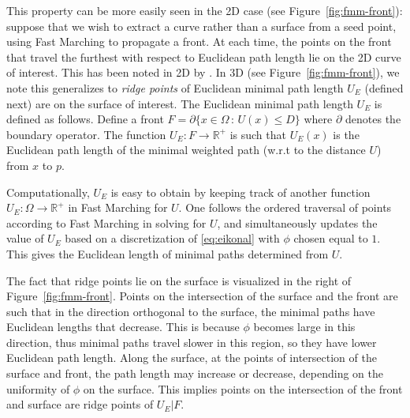 \documentclass[10pt,journal,compsoc]{IEEEtran}
\newcommand{\R}{\mathbb{R}}
\begin{document}
This property can be more easily seen in the 2D case (see
Figure~\ref{fig:fmm-front}): suppose that we wish to extract a curve
rather than a surface from a seed point, using Fast Marching to
propagate a front. At each time, the points on the front that travel
the furthest with respect to Euclidean path length lie on the 2D curve
of interest. This has been noted in 2D by \cite{kaul2012detecting}. In
3D (see Figure~\ref{fig:fmm-front}), we note this generalizes to
\emph{ridge points} of Euclidean minimal path length $U_E$ (defined
next) are on the surface of interest. The Euclidean minimal path
length $U_E$ is defined as follows. Define a front
$F = \partial \{ x\in \Omega \,:\, U(x) \leq D \}$ where $\partial$
denotes the boundary operator. The function $U_E : F\to \R^+$ is such
that $U_E(x) $ is the Euclidean path length of the minimal weighted
path (w.r.t to the distance $U$) from $x$ to $p$.

Computationally, $U_E$ is easy to obtain by keeping track of another
function $U_E : \Omega \to\R^+$ in Fast Marching for $U$. One follows
the ordered traversal of points according to Fast Marching in solving
for $U$, and simultaneously updates the value of $U_E$ based on a
discretization of \eqref{eq:eikonal} with $\phi$ chosen equal to
$1$. This gives the Euclidean length of minimal paths determined from
$U$.

The fact that ridge points lie on the surface is visualized in the
right of Figure~\ref{fig:fmm-front}. Points on the intersection of the
surface and the front are such that in the direction orthogonal to the
surface, the minimal paths have Euclidean lengths that decrease.  This
is because $\phi$ becomes large in this direction, thus minimal paths
travel slower in this region, so they have lower Euclidean path
length. Along the surface, at the points of intersection of the
surface and front, the path length may increase or decrease, depending
on the uniformity of $\phi$ on the surface. This implies points on the
intersection of the front and surface are ridge points of $U_E | F$.
\end{document}
